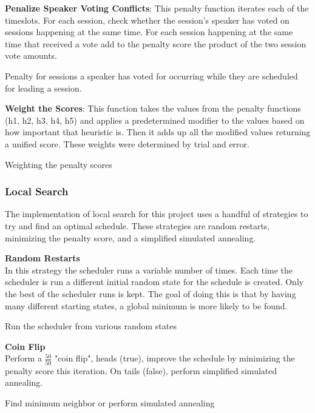 \textbf{Penalize Speaker Voting Conflicts}: This penalty function iterates each of the timeslots. For each session, check whether the session's speaker has voted on sessions happening at the same time. For each session happening at the same time that received a vote add to the penalty score the product of the two session vote amounts.
\begin{pseudocode}{Penalty for sessions a speaker has voted for occurring while they are scheduled for leading a session.}
    
\end{pseudocode}

\textbf{Weight the Scores}: This function takes the values from the penalty functions (h1, h2, h3, h4, h5) and applies a predetermined modifier to the values based on how important that heuristic is. Then it adds up all the modified values returning a unified score. These weights were determined by trial and error.
\begin{pseudocode}{Weighting the penalty scores}
    
\end{pseudocode}

\subsubsection{Local Search}
The implementation of local search for this project uses a handful of strategies to try and find an optimal schedule. These strategies are random restarts, minimizing the penalty score, and a simplified simulated annealing.

\textbf{Random Restarts}\\In this strategy the scheduler runs a variable number of times. Each time the scheduler is run a different initial random state for the schedule is created. Only the best of the scheduler runs is kept. The goal of doing this is that by having many different starting states, a global minimum is more likely to be found.
\begin{pseudocode}{Run the scheduler from various random states}

\end{pseudocode}

\textbf{Coin Flip}\\
Perform a \(\frac{50}{50}\) "coin flip", heads (true), improve the schedule  by minimizing the penalty score this iteration. On tails (false), perform simplified simulated annealing.
\begin{pseudocode}{Find minimum neighbor or perform simulated annealing}

\end{pseudocode}

